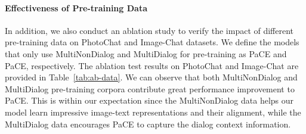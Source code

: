 \documentclass[11pt]{article}
\begin{document}
\paragraph{Effectiveness of Pre-training Data}
In addition, we also conduct an ablation study to verify the impact of different pre-training data on PhotoChat and Image-Chat datasets. We define the models that only use MultiNonDialog and MultiDialog for pre-training as PaCE and PaCE, respectively. The ablation test results on PhotoChat and Image-Chat are provided in Table~\ref{tab:ab-data}. We can observe that both MultiNonDialog and MultiDialog pre-training corpora contribute great performance improvement to PaCE. This is within our expectation since the MultiNonDialog data helps our model learn impressive image-text representations and their alignment, while the MultiDialog data encourages PaCE to capture the dialog context information.
\begin{table}[h]
    \centering
    \caption{
     Ablation test results on the multi-modal dialog retrieval task by using different pre-training objectives. 
    }
    \label{tab:ab-stage1}
\end{table}
\end{document}
